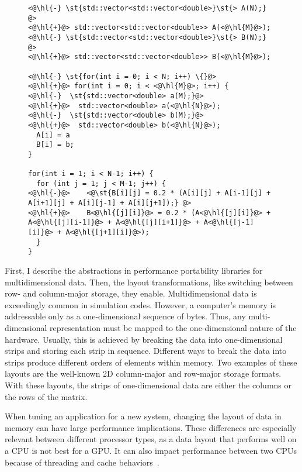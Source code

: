 \begin{figure}
\begin{lstlisting}[caption={Code changes required to switch from row- to column-major order in the C++ implementation of the 5 point stencil.},label=stencilCppColumn]
<@\hl{-} \st{std::vector<std::vector<double>}\st{> A(N);} @>
<@\hl{+}@> std::vector<std::vector<double>> A(<@\hl{M}@>);
<@\hl{-} \st{std::vector<std::vector<double>}\st{> B(N);} @>
<@\hl{+}@> std::vector<std::vector<double>> B(<@\hl{M}@>);

<@\hl{-} \st{for(int i = 0; i < N; i++) \{}@>
<@\hl{+}@> for(int i = 0; i < <@\hl{M}@>; i++) {
<@\hl{-}  \st{std::vector<double> a(M);}@>
<@\hl{+}@>  std::vector<double> a(<@\hl{N}@>);
<@\hl{-}  \st{std::vector<double> b(M);}@>
<@\hl{+}@>  std::vector<double> b(<@\hl{N}@>);
  A[i] = a
  B[i] = b;
}

for(int i = 1; i < N-1; i++) {
  for (int j = 1; j < M-1; j++) {
<@\hl{-}@>    <@\st{B[i][j] = 0.2 * (A[i][j] + A[i-1][j] + A[i+1][j] + A[i][j-1] + A[i][j+1]);} @>
<@\hl{+}@>    B<@\hl{[j][i]}@> = 0.2 * (A<@\hl{[j][i]}@> + A<@\hl{[j][i-1]}@> + A<@\hl{[j][i+1]}@> + A<@\hl{[j-1][i]}@> + A<@\hl{[j+1][i]}@>);
  }
}
\end{lstlisting}
\end{figure}

First, I describe the abstractions in performance portability libraries for multidimensional data.
Then, the layout transformations, like switching between row- and column-major storage, they enable.
Multidimensional data is exceedingly common in simulation codes.
However, a computer's memory is addressable only as a one-dimensional sequence of bytes.
Thus, any multi-dimensional representation must be mapped to the one-dimensional nature of the hardware.
Usually, this is achieved by breaking the data into one-dimensional strips and storing each strip in sequence.
Different ways to break the data into strips produce different orders of elements within memory.
Two examples of these layouts are the well-known 2D column-major and row-major storage formats.
With these layouts, the strips of one-dimensional data are either the columns or the rows of the matrix.

When tuning an application for a new system, changing the layout of data in memory can have large performance implications.
These differences are especially relevant between different processor types, as a data layout that performs well on a CPU is not best for a GPU\@.
It can also impact performance between two CPUs because of threading and cache behaviors~\cite{trott2021kokkos}.

